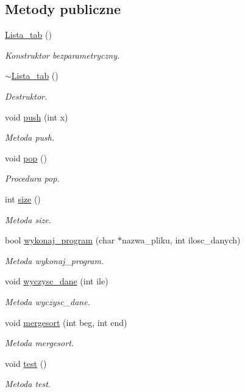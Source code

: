 \subsection*{Metody publiczne}
\begin{DoxyCompactItemize}
\item 
\hyperlink{class_lista__tab_af10d3131eadfebb4df8abbe6379e6d7c}{Lista\-\_\-tab} ()
\begin{DoxyCompactList}\small\item\em Konstruktor bezparametryczny. \end{DoxyCompactList}\item 
\hyperlink{class_lista__tab_aaf55f952c14d2996c6f1e09acd718528}{$\sim$\-Lista\-\_\-tab} ()
\begin{DoxyCompactList}\small\item\em Destruktor. \end{DoxyCompactList}\item 
void \hyperlink{class_lista__tab_a800998768639b41b5be5c52ec4ccbda4}{push} (int x)
\begin{DoxyCompactList}\small\item\em Metoda push. \end{DoxyCompactList}\item 
void \hyperlink{class_lista__tab_affc42a7ffc6eda21076fc56eae38e980}{pop} ()
\begin{DoxyCompactList}\small\item\em Procedura pop. \end{DoxyCompactList}\item 
int \hyperlink{class_lista__tab_af092dd7943f7cd5ff407485f2991a1e4}{size} ()
\begin{DoxyCompactList}\small\item\em Metoda size. \end{DoxyCompactList}\item 
bool \hyperlink{class_lista__tab_ac9adc6ecc7348c5e1871b239c1313405}{wykonaj\-\_\-program} (char $\ast$nazwa\-\_\-pliku, int ilosc\-\_\-danych)
\begin{DoxyCompactList}\small\item\em Metoda wykonaj\-\_\-program. \end{DoxyCompactList}\item 
void \hyperlink{class_lista__tab_a506a6de79a600bac8316a6caf9878528}{wyczysc\-\_\-dane} (int ile)
\begin{DoxyCompactList}\small\item\em Metoda wyczysc\-\_\-dane. \end{DoxyCompactList}\item 
void \hyperlink{class_lista__tab_a409e9a4edbef4337980c7184b6cbfb63}{mergesort} (int beg, int end)
\begin{DoxyCompactList}\small\item\em Metoda mergesort. \end{DoxyCompactList}\item 
void \hyperlink{class_lista__tab_a34c4a75347b05d367d7d1b08fcbde095}{test} ()
\begin{DoxyCompactList}\small\item\em Metoda test. \end{DoxyCompactList}\end{DoxyCompactItemize}

